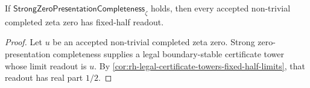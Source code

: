 \begin{corollary}
\label{cor:rh-certificate-tower-proof-load}
If $\mathsf{StrongZeroPresentationCompleteness}_{\zeta}$ holds, then
every accepted non-trivial completed zeta zero has fixed-half readout.
\end{corollary}

\begin{proof}
Let $u$ be an accepted non-trivial completed zeta zero. Strong
zero-presentation completeness supplies a legal boundary-stable
certificate tower whose limit readout is $u$. By
\autoref{cor:rh-legal-certificate-towers-fixed-half-limits}, that readout
has real part $1/2$.
\end{proof}
